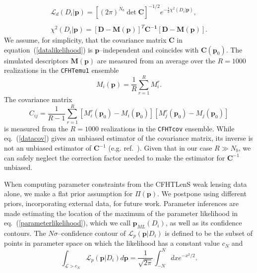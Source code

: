 \documentclass[reprint,aps,prd,superscriptaddress,showkeys,showpacs]{revtex4-1}
\begin{document}
\begin{equation}
\label{datalikelihood}
\begin{matrix}
\mathcal{L}_d(D_i\vert \mathbf{p}) = [(2\pi)^{N_b}\det{\mathbf{C}}]^{-1/2} e^{-\frac{1}{2}\chi^2(D_i\vert \mathbf{p})}, \\ \\
\chi^2(D_i\vert \mathbf{p}) = \mathbf{[D - M(p)]}^T\mathbf{C^{-1}[D-M(p)]}.
\end{matrix}
\end{equation} 
We assume, for simplicity, that the covariance matrix $\mathbf{C}$ in
equation~(\ref{datalikelihood}) is $\mathbf{p}$--independent and
coincides with $\mathbf{C}(\mathbf{p}_0)$. The simulated descriptors $\mathbf{M(p)}$ are
measured from an average over the $R=1000$ realizations in the \texttt{CFHTemu1} ensemble  
\begin{equation}
M_i(\mathbf{p}) = \frac{1}{R}\sum_{r=1}^R M_i^r .
\end{equation}
The covariance matrix 
\begin{equation}
\label{datacov}
C_{ij} = \frac{1}{R-1} \sum_{r=1}^R [M_i^r(\mathbf{p}_0)-M_i(\mathbf{p}_0)][M_j^r(\mathbf{p}_0)-M_j(\mathbf{p}_0)]
\end{equation}
is measured from the  $R=1000$ realizations in the \texttt{CFHTcov} ensemble.
While eq.~(\ref{datacov}) gives an unbiased estimator of the
covariance matrix, its inverse is not an unbiased estimator of
$\mathbf{C}^{-1}$ (e.g. ref.~\citep{RayTracingHartlap}). Given that in
our case $R\gg N_b$, we can safely neglect the correction factor
needed to make the estimator for $\mathbf{C}^{-1}$ unbiased.

When computing parameter constraints from the CFHTLenS weak lensing
data alone, we make a flat prior assumption for $\Pi(\mathbf{p})$.  We
postpone using different priors, incorporating external data, for
future work. Parameter inferences are made estimating the location of
the maximum of the parameter likelihood in
eq.~(\ref{parameterlikelihood}), which we call $\mathbf{p}_{ML}(D_i)$,
as well as its confidence contours. The $N\sigma$--confidence contour
of $\mathcal{L}_p(\mathbf{p}\vert D_i)$ is defined to be the subset of
points in parameter space on which the likelihood has a constant value
$c_N$ and
\begin{equation}
\label{ennesigma}
\int_{\mathcal{L}>c_N} \mathcal{L}_p(\mathbf{p}\vert D_i) d\mathbf{p} = \frac{1}{\sqrt{2\pi}}\int_{-N}^N dx e^{-x^2/2}.
\end{equation}
\end{document}
